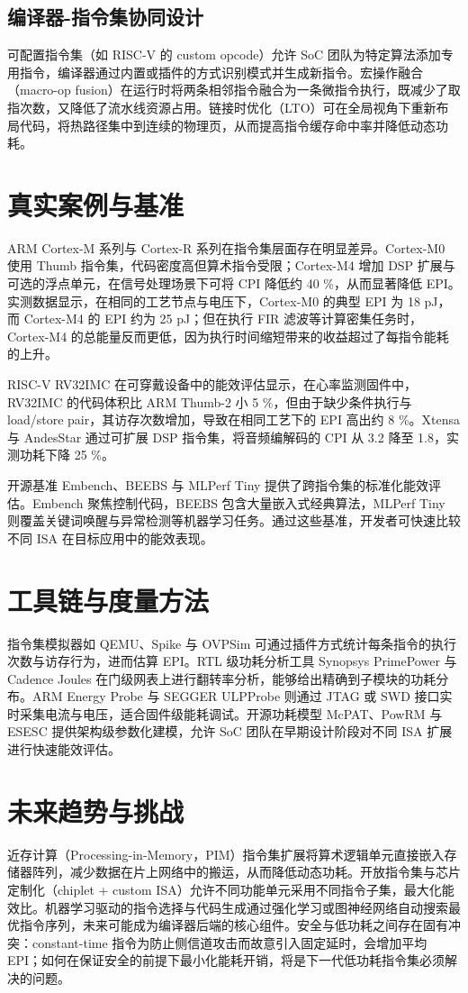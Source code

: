 \section{编译器-指令集协同设计}
可配置指令集（如 RISC-V 的 custom opcode）允许 SoC 团队为特定算法添加专用指令，编译器通过内置或插件的方式识别模式并生成新指令。宏操作融合（macro-op fusion）在运行时将两条相邻指令融合为一条微指令执行，既减少了取指次数，又降低了流水线资源占用。链接时优化（LTO）可在全局视角下重新布局代码，将热路径集中到连续的物理页，从而提高指令缓存命中率并降低动态功耗。\par
\chapter{真实案例与基准}
ARM Cortex-M 系列与 Cortex-R 系列在指令集层面存在明显差异。Cortex-M0 使用 Thumb 指令集，代码密度高但算术指令受限；Cortex-M4 增加 DSP 扩展与可选的浮点单元，在信号处理场景下可将 CPI 降低约 40 \%{}，从而显著降低 EPI。实测数据显示，在相同的工艺节点与电压下，Cortex-M0 的典型 EPI 为 18 pJ，而 Cortex-M4 的 EPI 约为 25 pJ；但在执行 FIR 滤波等计算密集任务时，Cortex-M4 的总能量反而更低，因为执行时间缩短带来的收益超过了每指令能耗的上升。\par
RISC-V RV32IMC 在可穿戴设备中的能效评估显示，在心率监测固件中，RV32IMC 的代码体积比 ARM Thumb-2 小 5 \%{}，但由于缺少条件执行与 load/store pair，其访存次数增加，导致在相同工艺下的 EPI 高出约 8 \%{}。Xtensa 与 AndesStar 通过可扩展 DSP 指令集，将音频编解码的 CPI 从 3.2 降至 1.8，实测功耗下降 25 \%{}。\par
开源基准 Embench、BEEBS 与 MLPerf Tiny 提供了跨指令集的标准化能效评估。Embench 聚焦控制代码，BEEBS 包含大量嵌入式经典算法，MLPerf Tiny 则覆盖关键词唤醒与异常检测等机器学习任务。通过这些基准，开发者可快速比较不同 ISA 在目标应用中的能效表现。\par
\chapter{工具链与度量方法}
指令集模拟器如 QEMU、Spike 与 OVPSim 可通过插件方式统计每条指令的执行次数与访存行为，进而估算 EPI。RTL 级功耗分析工具 Synopsys PrimePower 与 Cadence Joules 在门级网表上进行翻转率分析，能够给出精确到子模块的功耗分布。ARM Energy Probe 与 SEGGER ULPProbe 则通过 JTAG 或 SWD 接口实时采集电流与电压，适合固件级能耗调试。开源功耗模型 McPAT、PowRM 与 ESESC 提供架构级参数化建模，允许 SoC 团队在早期设计阶段对不同 ISA 扩展进行快速能效评估。\par
\chapter{未来趋势与挑战}
近存计算（Processing-in-Memory，PIM）指令集扩展将算术逻辑单元直接嵌入存储器阵列，减少数据在片上网络中的搬运，从而降低动态功耗。开放指令集与芯片定制化（chiplet + custom ISA）允许不同功能单元采用不同指令子集，最大化能效比。机器学习驱动的指令选择与代码生成通过强化学习或图神经网络自动搜索最优指令序列，未来可能成为编译器后端的核心组件。安全与低功耗之间存在固有冲突：constant-time 指令为防止侧信道攻击而故意引入固定延时，会增加平均 EPI；如何在保证安全的前提下最小化能耗开销，将是下一代低功耗指令集必须解决的问题。\par
